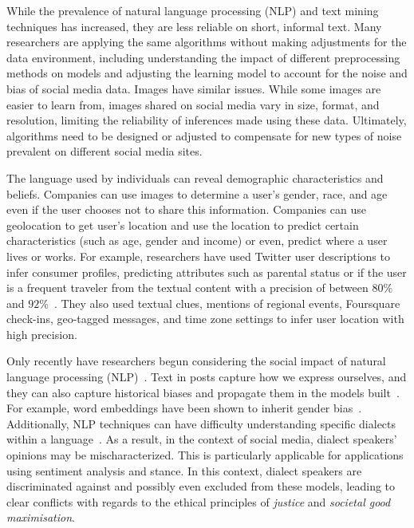 \documentclass[11pt]{article} %
\begin{document}
While the prevalence of natural language processing (NLP) and text mining techniques has increased, they are less reliable on short, informal text. Many researchers are applying the same algorithms without making adjustments for the data environment, including understanding the impact of different preprocessing methods on models and adjusting the learning model to account for the noise and bias of social media data. Images have similar issues. While some images are easier to learn from, images shared on social media vary in size, format, and resolution, limiting the reliability of inferences made using these data. Ultimately, algorithms need to be designed or adjusted to compensate for new types of noise prevalent on different social media sites. 


The language used by individuals can reveal demographic characteristics and beliefs. Companies can use images to determine a user's  gender, race, and age even if the user chooses not to share this information. Companies can use geolocation to get user's location and use the location to predict certain characteristics (such as age, gender and income) or even, predict where a user lives or works. For example, researchers have used Twitter user descriptions to infer consumer profiles, predicting attributes such as parental status or if the user is a frequent traveler from the textual content with a precision of between $80\%$ and $92\%$~\cite{hernandez2013}. They also used textual clues, mentions of regional events, Foursquare check-ins, geo-tagged messages, and time zone settings to infer user location with high precision. 

Only recently have researchers begun considering the social impact of natural language processing (NLP)~\cite{hovy2016,blodgett2020}. Text in posts capture how we express ourselves, and they can also capture historical biases and propagate them in the models built~\cite{garg2018,caliskan2017}. For example, word embeddings have been shown to inherit gender bias~\cite{sun2019,bolukbasi2016a,gonen2019}. Additionally, NLP techniques can have difficulty understanding specific dialects within a language~\cite{blodgett2016}. As a result, in the context of social media, dialect speakers’ opinions may be mischaracterized. This is particularly applicable for applications using sentiment analysis and stance. In this context, dialect speakers are discriminated against and possibly even excluded from these models, leading to clear conflicts with regards to the ethical principles of \textit{justice} and \textit{societal good maximisation}\cite{mikal2016}.
\end{document}
